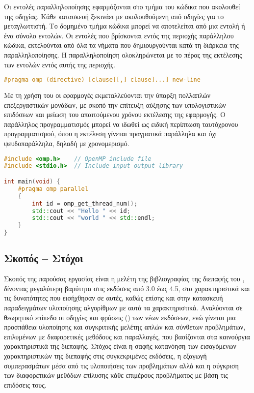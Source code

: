 Οι εντολές παραλληλοποίησης εφαρμόζονται στο τμήμα του κώδικα που ακολουθεί της οδηγίας. Κάθε
κατασκευή ξεκινάει με \textbf{\emph{}} ακολουθούμενη από οδηγίες για το
μεταγλωττιστή. Το δομημένο τμήμα κώδικα μπορεί να αποτελείται από μια εντολή ή ένα σύνολο εντολών\cite{ompsyntaxrefguide}. Οι εντολές που βρίσκονται εντός της περιοχής παράλληλου κώδικα,
εκτελούνται από όλα τα νήματα που δημιουργούνται κατά τη διάρκεια της παραλληλοποίησης. Η
παραλληλοποίηση ολοκληρώνεται με το πέρας της εκτέλεσης των εντολών εντός αυτής της περιοχής. \ \\
\begin{lstlisting}[language=C++, caption={\el{Γραμματική σύνταξης οδηγίας} OpenMP}, frame = single, xleftmargin=.1\textwidth]
#pragma omp (directive) [clause[[,] clause]...] new-line
\end{lstlisting} 
Με τη χρήση του \emph{} οι εφαρμογές εκμεταλλεύονται την ύπαρξη πολλαπλών επεξεργαστικών
μονάδων, με σκοπό την επίτευξη αύξησης των υπολογιστικών επιδόσεων και μείωση του απαιτούμενου
χρόνου εκτέλεσης της εφαρμογής. Ο παράλληλος προγραμματισμός μπορεί να ιδωθεί ως ειδική περίπτωση
ταυτόχρονου προγραμματισμού, όπου η εκτέλεση γίνεται πραγματικά παράλληλα και όχι
ψευδοπαράλληλα, δηλαδή με χρονομερισμό\cite{googleparallelprog}. \ \\
\begin{spacing}{1.1}
\begin{lstlisting}[showstringspaces=false, language=C++, caption={\el{Παράδειγμα παράλληλου κώδικα} OpenMP}, frame=tb]
#include <omp.h>    // OpenMP include file
#include <stdio.h>  // Include input-output library

int main(void) {
    #pragma omp parallel 
    {
        int id = omp_get_thread_num();
        std::cout << "Hello " << id;
        std::cout << "world " << std::endl;
    }
}
\end{lstlisting}
\end{spacing}

\subsection{Σκοπός – Στόχοι}
Σκοπός της παρούσας εργασίας είναι η μελέτη της βιβλιογραφίας της διεπαφής του \emph{},
δίνοντας μεγαλύτερη βαρύτητα στις εκδόσεις από 3.0 έως 4.5, στα χαρακτηριστικά και τις δυνατότητες
που εισήχθησαν σε αυτές, καθώς επίσης και στην κατασκευή παραδειγμάτων υλοποίησης αλγορίθμων με αυτά
τα χαρακτηριστικά. Αναλύονται σε θεωρητικό επίπεδο οι οδηγίες και φράσεις (\emph{})
των νέων εκδόσεων, ενώ γίνεται μια προσπάθεια υλοποίησης και συγκριτικής μελέτης απλών και σύνθετων
προβλημάτων, επιλυμένων με διαφορετικές μεθόδους και παραλλαγές, που βασίζονται στα καινούργια
χαρακτηριστικά της διεπαφής. Στόχος είναι η σαφής κατανόηση των εισαγόμενων χαρακτηριστικών της
διεπαφής στις συγκεκριμένες εκδόσεις, η εξαγωγή συμπερασμάτων μέσα από τις υλοποιήσεις των
προβλημάτων αλλά και η σύγκριση των διαφορετικών μεθόδων επίλυσης κάθε επιμέρους προβλήματος με βάση
τις επιδόσεις τους.

